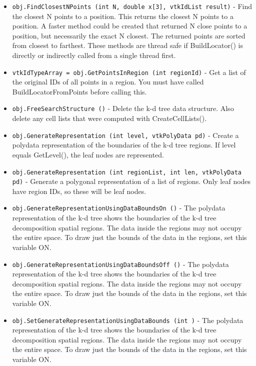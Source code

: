 \begin{itemize}
\item  \verb|obj.FindClosestNPoints (int N, double x[3], vtkIdList result)| -  Find the closest N points to a position. This returns the closest
 N points to a position. A faster method could be created that returned
 N close points to a position, but necessarily the exact N closest.
 The returned points are sorted from closest to farthest.
 These methods are thread safe if BuildLocator() is directly or
 indirectly called from a single thread first.

\item  \verb|vtkIdTypeArray = obj.GetPointsInRegion (int regionId)| -  Get a list of the original IDs of all points in a region.  You
 must have called BuildLocatorFromPoints before calling this.

\item  \verb|obj.FreeSearchStructure ()| -  Delete the k-d tree data structure. Also delete any
 cell lists that were computed with CreateCellLists().

\item  \verb|obj.GenerateRepresentation (int level, vtkPolyData pd)| -  Create a polydata representation of the boundaries of
 the k-d tree regions.  If level equals GetLevel(), the
 leaf nodes are represented.

\item  \verb|obj.GenerateRepresentation (int regionList, int len, vtkPolyData pd)| -     Generate a polygonal representation of a list of regions.
    Only leaf nodes have region IDs, so these will be leaf nodes.

\item  \verb|obj.GenerateRepresentationUsingDataBoundsOn ()| -     The polydata representation of the k-d tree shows the boundaries
    of the k-d tree decomposition spatial regions.  The data inside
    the regions may not occupy the entire space.  To draw just the
    bounds of the data in the regions, set this variable ON.

\item  \verb|obj.GenerateRepresentationUsingDataBoundsOff ()| -     The polydata representation of the k-d tree shows the boundaries
    of the k-d tree decomposition spatial regions.  The data inside
    the regions may not occupy the entire space.  To draw just the
    bounds of the data in the regions, set this variable ON.

\item  \verb|obj.SetGenerateRepresentationUsingDataBounds (int )| -     The polydata representation of the k-d tree shows the boundaries
    of the k-d tree decomposition spatial regions.  The data inside
    the regions may not occupy the entire space.  To draw just the
    bounds of the data in the regions, set this variable ON.


\end{itemize}

